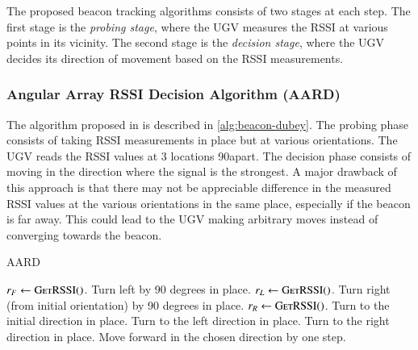 \documentclass[conference]{IEEEtran}
\begin{document}
The proposed beacon tracking algorithms consists of two stages at each step. The
first stage is the \emph{probing stage}, where the UGV measures the RSSI at
various points in its vicinity. The second stage is the \emph{decision stage},
where the UGV decides its direction of movement based on the RSSI measurements.
%
\subsubsection{Angular Array RSSI Decision Algorithm (AARD)}
\label{subsubsec:existing-algorithm}

The algorithm proposed in \cite{dubeyNavigationCommunicationUGV2022} is
described in \autoref{alg:beacon-dubey}. The probing phase consists of taking
RSSI measurements in place but at various orientations. The UGV reads the RSSI
values at 3 locations 90\degree apart.  The decision phase consists of moving in
the direction where the signal is the strongest. A major drawback of this
approach is that there may not be appreciable difference in the measured RSSI
values at the various orientations in the same place, especially if the beacon
is far away. This could lead to the UGV making arbitrary moves instead of
converging towards the beacon.

\begin{algorithm}[H]
    \caption{AARD}
    \label{alg:beacon-dubey}
    \begin{algorithmic}[1]
            \State \(r_F \gets \textsc{GetRSSI()}\).
            \State Turn left by 90 degrees in place.
            \State \(r_L \gets \textsc{GetRSSI()}\).
            \State Turn right (from initial orientation) by 90 degrees in place.
            \State \(r_R \gets \textsc{GetRSSI()}\).
                \State Turn to the initial direction in place.
                \State Turn to the left direction in place.
                \State Turn to the right direction in place.
            \EndIf
            \State Move forward in the chosen direction by one step.
        \EndWhile
    \end{algorithmic}
\end{algorithm}
\end{document}

